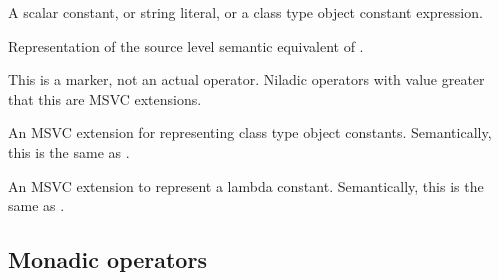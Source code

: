 A scalar constant, or string literal, or a class type object constant expression.

Representation of the source level semantic equivalent of .

This is a marker, not an actual operator. Niladic operators with 
value greater that this are MSVC extensions.

An MSVC extension for representing class type object constants.
Semantically, this is the same as .


An MSVC extension to represent a lambda constant.
Semantically, this is the same as .



\subsection{Monadic operators}
\label{sec:ifc:OperatorSort:Monadic}


